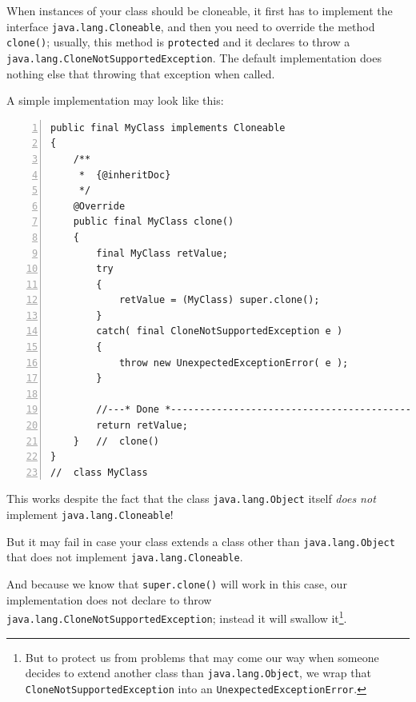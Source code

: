 \documentclass[11pt,a4paper, titlepage, parskip=half, headsepline, footsepline, cleardoublepage=current, headheight=1cm]{scrbook}
\begin{document}
When instances of your class should be cloneable, it first has to implement the interface \lstinline|java.lang.Cloneable|\autocite{ORACLE_DOC_CLONEABLE_INTERFACE}, and then you need to override the method \lstinline|clone()|; usually, this method is \lstinline|protected| and it declares to throw a \lstinline|java.lang.CloneNotSupportedException|\autocite{ORACLE_DOC_CLONENOTSUPPORTEDEXCEPTION_CLASS}. The default implementation does nothing else that throwing that exception when called.

A simple implementation may look like this:
\begin{lstlisting}[numbers=left,caption={A simple clone() Method}]
public final MyClass implements Cloneable
{
    /**
     *  {@inheritDoc}
     */
    @Override
    public final MyClass clone()
    {
        final MyClass retValue;
        try
        {
            retValue = (MyClass) super.clone();
        }    
        catch( final CloneNotSupportedException e )
        {
            throw new UnexpectedExceptionError( e );
        }
        
        //---* Done *------------------------------------------------
        return retValue;
    }   //  clone() 
}
//  class MyClass
\end{lstlisting}
This works despite the fact that the class \lstinline|java.lang.Object| itself \textit{does not} implement \lstinline|java.lang.Cloneable|!

But it may fail in case your class extends a class other than \lstinline|java.lang.Object| that does not implement \lstinline|java.lang.Cloneable|.

And because we know that \lstinline|super.clone()| will work in this case, our implementation does not declare to throw \lstinline|java.lang.CloneNotSupportedException|; instead it will swallow it\footnote{But to protect us from problems that may come our way when someone decides to extend another class than \lstinline|java.lang.Object|, we wrap that \lstinline|CloneNotSupportedException| into an \lstinline|UnexpectedExceptionError|\autocite{TQUADRAT_ORG_FOUNDATION_UNEXPECTEDEXCEPTIONERROR}.}.
\end{document}
